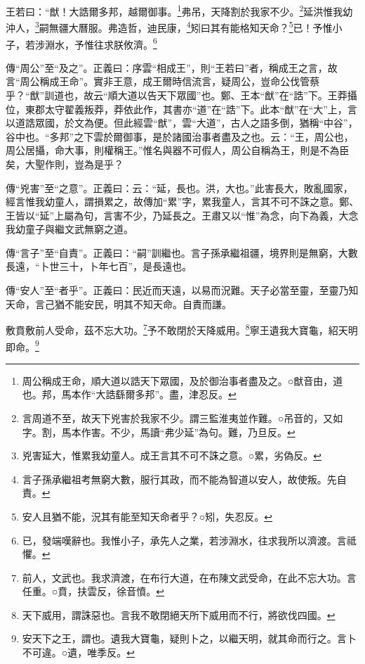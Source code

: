 王若曰：“猷！大誥爾多邦，越爾御事。\footnote{周公稱成王命，順大道以誥天下眾國，及於御治事者盡及之。○猷音由，道也。邦，馬本作“大誥繇爾多邦”。盡，津忍反。}弗吊，天降割於我家不少。\footnote{言周道不至，故天下兇害於我家不少。謂三監淮夷並作難。○吊音的，又如字。割，馬本作害。不少，馬讀“弗少延”為句。難，乃旦反。}延洪惟我幼沖人，\footnote{兇害延大，惟累我幼童人。成王言其不可不誅之意。○累，劣偽反。}嗣無疆大曆服。弗造哲，迪民康，\footnote{言子孫承繼祖考無窮大數，服行其政，而不能為智道以安人，故使叛。先自責。}矧曰其有能格知天命？\footnote{安人且猶不能，況其有能至知天命者乎？○矧，失忍反。}已！予惟小子，若涉淵水，予惟往求朕攸濟。\footnote{已，發端嘆辭也。我惟小子，承先人之業，若涉淵水，往求我所以濟渡。言祗懼。}


{\noindent\zhuan{}\fzbyks 傳“周公”至“及之”。正義曰：序雲“相成王”，則“王若曰”者，稱成王之言，故言“周公稱成王命”。實非王意，成王爾時信流言，疑周公，豈命公伐管蔡乎？“猷”訓道也，故云“順大道以告天下眾國”也。鄭、王本“猷”在“誥”下。王莽攝位，東郡太守翟義叛莽，莽依此作，其書亦“道”在“誥”下。此本“猷”在“大”上，言以道誥眾國，於文為便。但此經雲“猷”，雲“大道”，古人之語多倒，猶稱“中谷”，谷中也。“多邦”之下雲於爾御事，是於諸國治事者盡及之也。云：“王，周公也，周公居攝，命大事，則權稱王。”惟名與器不可假人，周公自稱為王，則是不為臣矣，大聖作則，豈為是乎？ \par}

{\noindent\zhuan{}\fzbyks 傳“兇害”至“之意”。正義曰：云：“延，長也。洪，大也。”此害長大，敗亂國家，經言惟我幼童人，謂損累之，故傳加“累”字，累我童人，言其不可不誅之意。鄭、王皆以“延”上屬為句，言害不少，乃延長之。王肅又以“惟”為念，向下為義，大念我幼童子與繼文武無窮之道。 \par}

{\noindent\zhuan{}\fzbyks 傳“言子”至“自責”。正義曰：“嗣”訓繼也。言子孫承繼祖疆，境界則是無窮，大數長遠，“卜世三十，卜年七百”，是長遠也。 \par}

{\noindent\zhuan{}\fzbyks 傳“安人”至“者乎”。正義曰：民近而天遠，以易而況難。天子必當至靈，至靈乃知天命，言己猶不能安民，明其不知天命。自責而謙。 \par}

敷賁敷前人受命，茲不忘大功。\footnote{前人，文武也。我求濟渡，在布行大道，在布陳文武受命，在此不忘大功。言任重。○賁，扶雲反，徐音憤。}予不敢閉於天降威用。\footnote{天下威用，謂誅惡也。言我不敢閉絕天所下威用而不行，將欲伐四國。}寧王遺我大寶龜，紹天明即命。\footnote{安天下之王，謂也。遺我大寶龜，疑則卜之，以繼天明，就其命而行之。言卜不可違。○遺，唯季反。}

